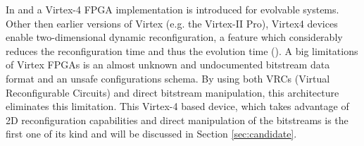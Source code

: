 
In \cite{virtex4} and \cite{dpr} a Virtex-4 FPGA implementation is introduced for evolvable systems. Other then earlier versions of Virtex (e.g. the Virtex-II Pro), Virtex4 devices enable two-dimensional dynamic reconfiguration, a feature which considerably reduces the reconfiguration time and thus the evolution time (\cite{virtex4}). A big limitations of Virtex FPGAs is an almost unknown and undocumented bitstream data format and an unsafe configurations schema. By using both VRCs (Virtual Reconfigurable Circuits) and direct bitstream manipulation, this architecture eliminates this limitation. This Virtex-4 based device, which takes advantage of 2D reconfiguration capabilities and direct manipulation of the bitstreams is the first one of its kind and will be discussed in Section \ref{sec:candidate}.